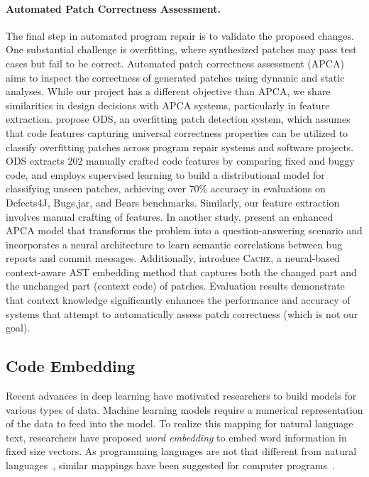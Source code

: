 \paragraph{Automated Patch Correctness Assessment.}
The final step in automated program repair is to validate the proposed changes. One substantial challenge is overfitting, where synthesized patches may pass test cases but fail to be correct. Automated patch correctness assessment (APCA) aims to inspect the correctness of generated patches using dynamic and static analyses. While our project has a different objective than APCA, we share similarities in design decisions with APCA systems, particularly in feature extraction. \cite{ye2021automated} propose ODS, an overfitting patch detection system, which assumes that code features capturing universal correctness properties can be utilized to classify overfitting patches across program repair systems and software projects. ODS extracts 202 manually crafted code features by comparing fixed and buggy code, and employs supervised learning to build a distributional model for classifying unseen patches, achieving over 70\% accuracy in evaluations on Defects4J, Bugs.jar, and Bears benchmarks. Similarly, our feature extraction involves manual crafting of features. In another study, \cite{tian2022change} present an enhanced APCA model that transforms the problem into a question-answering scenario and incorporates a neural architecture to learn semantic correlations between bug reports and commit messages. Additionally, \cite{lin2022context} introduce \textsc{Cache}, a neural-based context-aware AST embedding method that captures both the changed part and the unchanged part (context code) of patches. Evaluation results demonstrate that context knowledge significantly enhances the performance and accuracy of systems that attempt to automatically assess patch correctness (which is not our goal).


\subsection{Code Embedding}

Recent advances in deep learning have motivated researchers to build models for various types of data. Machine learning models require a numerical representation of the data to feed into the model. To realize this mapping for natural language text, researchers have proposed \emph{word embedding} to embed word information in fixed size vectors. As programming languages are not that different from natural languages~\citep{hindle2016naturalness}, similar mappings have been suggested for computer programs~\citep{chen2019literature}.

